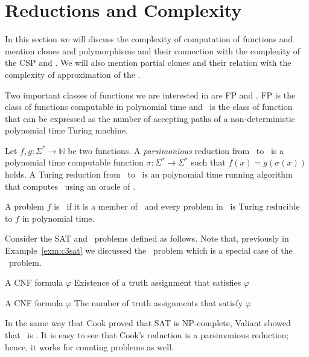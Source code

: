 \chapter{Reductions and Complexity}
In this section we will discuss the complexity of computation of functions
and mention clones and polymorphisms and their connection with 
the complexity of the CSP and \ccsp\@. We will also mention partial clones and
their relation with the complexity of approximation of the \ccsp\@.

Two important classes of functions we are interested in are FP and \cp\@.
FP is the class of functions computable in polynomial time and \cp\ is
the class of function that can be expressed as the
number of accepting paths of a non-deterministic polynomial time Turing machine. 

Let \(f,g:\Sigma^*\to\mathbb{N}\) be two functions. A \emph{parsimonious} reduction 
from \mf\ to \mg\ is a polynomial time computable function
\(\sigma:\Sigma^*\to\Sigma^*\) such that
\(f(x)=g(\sigma(x))\) holds. 
A Turing reduction from \mf\ to \mg\ is an polynomial time running algorithm
that computes \mf\ using an oracle of \mg\@.

\begin{defi} 
A problem \(f\) is \cpc\ if it is a member of \cp\ and every problem in \cp\ is 
Turing reducible to \(f\) in polynomial time.
\end{defi}

Consider the SAT and \csat\ problems defined as follows.
Note that, previously in Example~\ref{exm:c3sat} we discussed the \ctsat\ problem
which is a special case of the \csat\ problem.


{A CNF formula \(\varphi\)}
{Existence of a truth assignment that satisfies \(\varphi\)}

\pdef{\csat}
{A CNF formula \(\varphi\)}
{The number of truth assignments that satisfy \(\varphi\)}

In the same way that Cook \cite{cook1971} proved that SAT is NP-complete,
Valiant \cite{Valiant1979} showed that \csat\ is \cpc\@. It is easy to see that 
Cook's reduction is a parsimonious reduction; hence, it works for counting problems
as well. 

